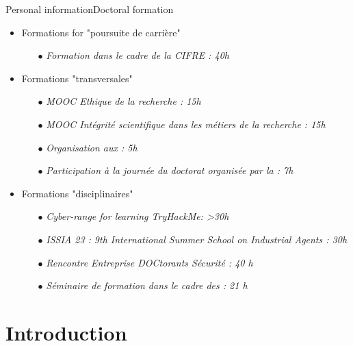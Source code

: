 \begin{frame}{Personal information}{Doctoral formation}

    \begin{itemize}
        \item Formations for "poursuite de carrière"
              \begin{itemize}
                  \item[$\bullet$] \textit{Formation dans le cadre de la CIFRE : 40h}
              \end{itemize}
        \item Formations "transversales"
              \begin{itemize}
                  \item[$\bullet$] \textit{MOOC Ethique de la recherche : 15h}
                  \item[$\bullet$] \textit{MOOC Intégrité scientifique dans les métiers de la recherche : 15h}
                  \item[$\bullet$] \textit{Organisation aux  : 5h }
                  \item[$\bullet$] \textit{Participation à la journée du doctorat organisée par la  : 7h}
              \end{itemize}
        \item Formations "disciplinaires"
              \begin{itemize}
                  \item[$\bullet$] \textit{Cyber-range for learning \textit{TryHackMe}: >30h}
                  \item[$\bullet$] \textit{ISSIA 23 : 9th International Summer School on Industrial Agents : 30h}
                  \item[$\bullet$] \textit{Rencontre Entreprise DOCtorants Sécurité : 40 h}
                  \item[$\bullet$] \textit{Séminaire de formation dans le cadre des  : 21 h}
              \end{itemize}
    \end{itemize}

\end{frame}

\section{Introduction}


